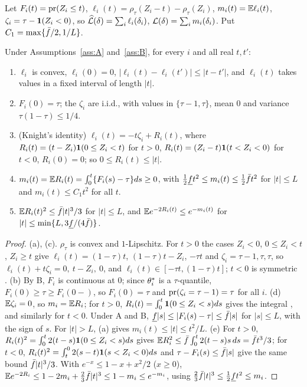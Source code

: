 Let $F_i(t)=\mathrm{pr}(Z_i\le t)$, $\ell_i(t)=\rho_\tau(Z_i-t)-\rho_\tau(Z_i)$, $m_i(t)=\mathbb{E}\ell_i(t)$, $\zeta_i=\tau-\mathbf 1(Z_i<0)$, so $\widehat{\mathcal L}(\delta)=\sum_i\ell_i(\delta_i)$, $\mathcal L(\delta)=\sum_im_i(\delta_i)$. Put $C_1=\max\{\bar f/2,1/L\}$.

\begin{lemma}\label{pf:lem:check}
Under Assumptions~\ref{ass:A} and~\ref{ass:B}, for every $i$ and all real $t,t'$:
\begin{enumerate}
\renewcommand{\labelenumi}{(\alph{enumi})}
\item $\ell_i$ is convex, $\ell_i(0)=0$, $|\ell_i(t)-\ell_i(t')|\le|t-t'|$, and $\ell_i(t)$ takes values in a fixed interval of length $|t|$.
\item $F_i(0)=\tau$; the $\zeta_i$ are i.i.d., with values in $\{\tau-1,\tau\}$, mean $0$ and variance $\tau(1-\tau)\le1/4$.
\item (Knight's identity) $\ell_i(t)=-t\zeta_i+R_i(t)$, where $R_i(t)=(t-Z_i)\mathbf 1(0\le Z_i<t)$ for $t>0$, $R_i(t)=(Z_i-t)\mathbf 1(t<Z_i<0)$ for $t<0$, $R_i(0)=0$; so $0\le R_i(t)\le|t|$.
\item $m_i(t)=\mathbb{E} R_i(t)=\int_0^t\{F_i(s)-\tau\}ds\ge0$, with $\tfrac12\underline f t^2\le m_i(t)\le\tfrac12\bar f t^2$ for $|t|\le L$ and $m_i(t)\le C_1t^2$ for all $t$.
\item $\mathbb{E} R_i(t)^2\le\bar f|t|^3/3$ for $|t|\le L$, and $\mathbb{E} e^{-2R_i(t)}\le e^{-m_i(t)}$ for $|t|\le\min\{L,3\underline f/(4\bar f)\}$.
\end{enumerate}
\end{lemma}

\begin{proof}
(a), (c). $\rho_\tau$ is convex and $1$-Lipschitz. For $t>0$ the cases $Z_i<0$, $0\le Z_i<t$, $Z_i\ge t$ give $\ell_i(t)=(1-\tau)t$, $(1-\tau)t-Z_i$, $-\tau t$ and $\zeta_i=\tau-1,\tau,\tau$, so $\ell_i(t)+t\zeta_i=0,\ t-Z_i,\ 0$, and $\ell_i(t)\in[-\tau t,(1-\tau)t]$; $t<0$ is symmetric \citep{knight1998limiting}.
(b) By B, $F_i$ is continuous at $0$; since $\theta^{*}_i$ is a $\tau$-quantile, $F_i(0)\ge\tau\ge F_i(0-)$, so $F_i(0)=\tau$ and $\mathrm{pr}(\zeta_i=\tau-1)=\tau$ for all $i$.
(d) $\mathbb{E}\zeta_i=0$, so $m_i=\mathbb{E} R_i$; for $t>0$, $R_i(t)=\int_0^t\mathbf 1(0\le Z_i<s)ds$ gives the integral \citep{belloni2011l1}, and similarly for $t<0$. Under A and B, $\underline f|s|\le|F_i(s)-\tau|\le\bar f|s|$ for $|s|\le L$, with the sign of $s$. For $|t|>L$, (a) gives $m_i(t)\le|t|\le t^2/L$.
(e) For $t>0$, $R_i(t)^2=\int_0^t2(t-s)\mathbf 1(0\le Z_i<s)ds$ gives $\mathbb{E} R_i^2\le\bar f\int_0^t2(t-s)s\,ds=\bar f t^3/3$; for $t<0$, $R_i(t)^2=\int_t^0 2(s-t)\mathbf 1(s<Z_i<0)ds$ and $\tau-F_i(s)\le\bar f|s|$ give the same bound $\bar f|t|^3/3$. With $e^{-x}\le1-x+x^2/2$ ($x\ge0$),
$\mathbb{E} e^{-2R_i}\le1-2m_i+\tfrac23\bar f|t|^3\le1-m_i\le e^{-m_i}$, using $\tfrac23\bar f|t|^3\le\tfrac12\underline f t^2\le m_i$.
\end{proof}

